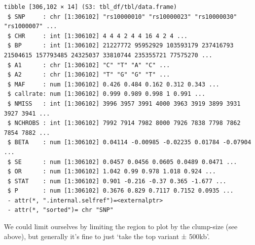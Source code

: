 \documentclass[
]{book}
\begin{document}
\begin{lstlisting}
tibble [306,102 × 14] (S3: tbl_df/tbl/data.frame)
 $ SNP     : chr [1:306102] "rs10000010" "rs10000023" "rs10000030" "rs1000007" ...
 $ CHR     : int [1:306102] 4 4 4 2 4 4 16 4 2 4 ...
 $ BP      : int [1:306102] 21227772 95952929 103593179 237416793 21504615 157793485 24325037 33810744 235355721 77575270 ...
 $ A1      : chr [1:306102] "C" "T" "A" "C" ...
 $ A2      : chr [1:306102] "T" "G" "G" "T" ...
 $ MAF     : num [1:306102] 0.426 0.484 0.162 0.312 0.343 ...
 $ callrate: num [1:306102] 0.999 0.989 0.998 1 0.991 ...
 $ NMISS   : int [1:306102] 3996 3957 3991 4000 3963 3919 3899 3931 3927 3941 ...
 $ NCHROBS : int [1:306102] 7992 7914 7982 8000 7926 7838 7798 7862 7854 7882 ...
 $ BETA    : num [1:306102] 0.04114 -0.00985 -0.02235 0.01784 -0.07904 ...
 $ SE      : num [1:306102] 0.0457 0.0456 0.0605 0.0489 0.0471 ...
 $ OR      : num [1:306102] 1.042 0.99 0.978 1.018 0.924 ...
 $ STAT    : num [1:306102] 0.901 -0.216 -0.37 0.365 -1.677 ...
 $ P       : num [1:306102] 0.3676 0.829 0.7117 0.7152 0.0935 ...
 - attr(*, ".internal.selfref")=<externalptr> 
 - attr(*, "sorted")= chr "SNP"
\end{lstlisting}

We could limit ourselves by limiting the region to plot by the clump-size (see above), but generally it's fine to just `take the top variant ± 500kb'.
\end{document}
